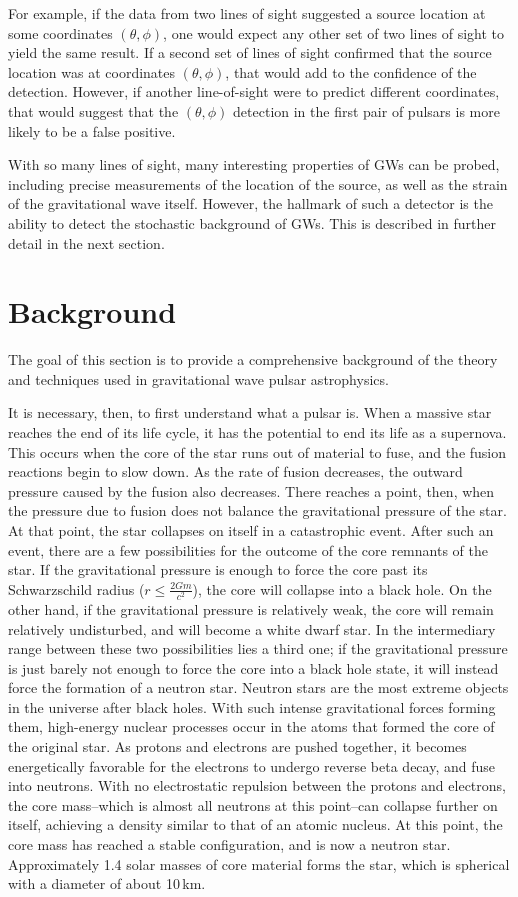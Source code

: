 \documentclass[12pt]{article}
\begin{document}
For example, if the data from two lines of sight suggested a source location
at some coordinates $(\theta,\phi)$, one would expect any other set of two lines of
sight to yield the same result. If a second set of lines of sight confirmed that
the source location was at coordinates $(\theta,\phi)$, that would add to the
confidence of the detection. However, if another line-of-sight were to predict
different coordinates, that would suggest that the $(\theta, \phi)$ detection in
the first pair of pulsars is more likely to be a false positive.

With so many lines of sight, many interesting properties of GWs
can be probed, including precise measurements of the location of the source, as
well as the strain of the gravitational wave itself. However, the hallmark of
such a detector is the ability to detect the stochastic background of
GWs. This is described in further detail in the next section.

\section{Background}
The goal of this section is to provide a comprehensive background of the theory
and techniques used in gravitational wave pulsar astrophysics.

It is necessary, then, to first understand what a pulsar is. When a massive star
reaches the end of its life cycle, it has the potential to end its life as a supernova. This
occurs when the core of the star runs out of material to fuse, and the fusion
reactions begin to slow down. As the rate of fusion decreases, the outward
pressure caused by the fusion also decreases. There reaches a point, then, when
the pressure due to fusion does not balance the gravitational pressure of the
star. At that point, the star collapses on itself in a catastrophic event.
After such an event, there are a few possibilities for the outcome of the core
remnants of the star. If the gravitational pressure is enough to force the core
past its Schwarzschild radius ($r\leq \frac{2Gm}{c^2}$), the core will collapse into a black hole. On the
other hand, if the gravitational pressure is relatively weak, the core will
remain relatively undisturbed, and will become a white dwarf star. In the
intermediary range between these two possibilities lies a third one; if the
gravitational pressure is just barely not enough to force the core into a black
hole state, it will instead force the formation of a neutron star.
Neutron stars are the most extreme objects in the universe after black holes. With such intense
gravitational forces forming them, high-energy nuclear processes occur in the
atoms that formed the core of the original star. As protons and electrons are
pushed together, it becomes energetically favorable for the electrons to undergo
reverse beta decay, and fuse into neutrons. With no electrostatic repulsion
between the protons and electrons, the core mass--which is almost all neutrons
at this point--can collapse further on itself, achieving a density similar to
that of an atomic nucleus. At this point, the core mass has reached a stable
configuration, and is now a neutron star. Approximately 1.4 solar masses of core
material forms the star, which is spherical with a diameter of about 10\,km.
\end{document}

